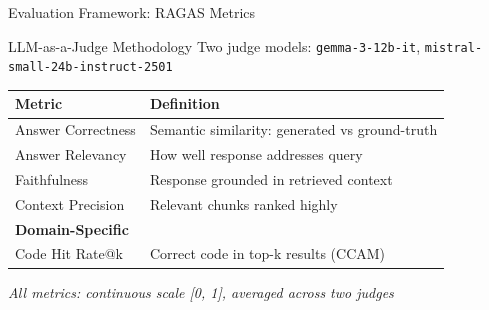 \documentclass[aspectratio=169]{beamer}
\begin{document}
\begin{frame}{Evaluation Framework: RAGAS Metrics}
\begin{block}{LLM-as-a-Judge Methodology}
Two judge models: \texttt{gemma-3-12b-it}, \texttt{mistral-small-24b-instruct-2501}
\end{block}

\begin{table}
\centering
\small
\begin{tabular}{ll}
\toprule
\textbf{Metric} & \textbf{Definition} \\
\midrule
Answer Correctness & Semantic similarity: generated vs ground-truth \\
Answer Relevancy & How well response addresses query \\
Faithfulness & Response grounded in retrieved context \\
Context Precision & Relevant chunks ranked highly \\
\midrule
\textbf{Domain-Specific} & \\
Code Hit Rate@k & Correct code in top-k results (CCAM) \\
\bottomrule
\end{tabular}
\end{table}

\vspace{0.2cm}
\textit{All metrics: continuous scale [0, 1], averaged across two judges}
\end{frame}
\end{document}
